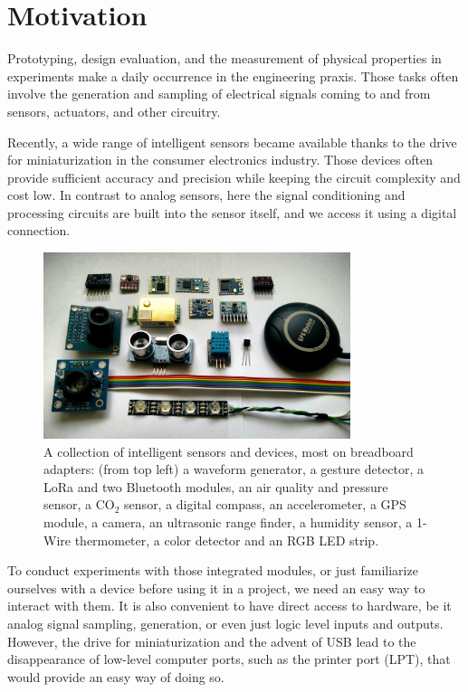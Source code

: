 \chapter{Motivation}

Prototyping, design evaluation, and the measurement of physical properties in experiments make a daily occurrence in the engineering praxis. Those tasks often involve the generation and sampling of electrical signals coming to and from sensors, actuators, and other circuitry.

Recently, a wide range of intelligent sensors became available thanks to the drive for miniaturization in the consumer electronics industry. Those devices often provide sufficient accuracy and precision while keeping the circuit complexity and cost low. In contrast to analog sensors, here the signal conditioning and processing circuits are built into the sensor itself, and we access it using a digital connection.

\begin{figure}[H]
	\centering
	\includegraphics[width=0.8\textwidth] {img/inteligent-sensors.jpg}
	\caption[A collection of intelligent sensors and devices]{A collection of intelligent sensors and devices, most on breadboard adapters: (from top left) a waveform generator, a gesture detector, a LoRa and two Bluetooth modules, an air quality and pressure sensor, a CO$_2$ sensor, a digital compass, an accelerometer, a GPS module, a camera, an ultrasonic range finder, a humidity sensor, a 1-Wire thermometer, a color detector and an RGB LED strip.}
\end{figure}

To conduct experiments with those integrated modules, or just familiarize ourselves with a device before using it in a project, we need an easy way to interact with them. It is also convenient to have direct access to hardware, be it analog signal sampling, generation, or even just logic level inputs and outputs. However, the drive for miniaturization and the advent of \gls{USB} lead to the disappearance of low-level computer ports, such as the printer port (LPT), that would provide an easy way of doing so.


